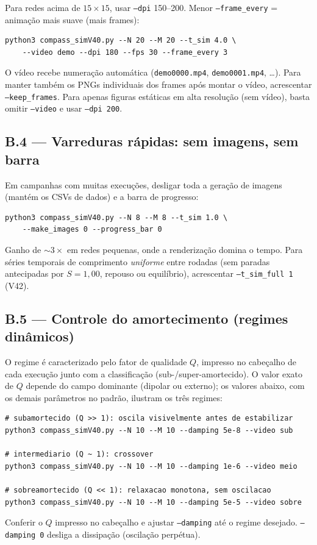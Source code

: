\documentclass[11pt,a4paper]{article}
\newcommand{\code}[1]{\texttt{#1}}
\begin{document}
Para redes acima de $15\times15$, usar \code{--dpi} 150--200. Menor
\code{--frame\_every} = animação mais suave (mais frames):
\begin{verbatim}
python3 compass_simV40.py --N 20 --M 20 --t_sim 4.0 \
    --video demo --dpi 180 --fps 30 --frame_every 3
\end{verbatim}
O vídeo recebe numeração automática (\code{demo0000.mp4},
\code{demo0001.mp4}, \dots). Para manter também os PNGs individuais dos
frames após montar o vídeo, acrescentar \code{--keep\_frames}. Para
apenas figuras estáticas em alta resolução (sem vídeo), basta omitir
\code{--video} e usar \code{--dpi 200}.

\subsection*{B.4 --- Varreduras rápidas: sem imagens, sem barra}

Em campanhas com muitas execuções, desligar toda a geração de imagens
(mantém os CSVs de dados) e a barra de progresso:
\begin{verbatim}
python3 compass_simV40.py --N 8 --M 8 --t_sim 1.0 \
    --make_images 0 --progress_bar 0
\end{verbatim}
Ganho de $\sim 3\times$ em redes pequenas, onde a renderização domina o
tempo. Para séries temporais de comprimento \emph{uniforme} entre
rodadas (sem paradas antecipadas por $S{=}1{,}00$, repouso ou
equilíbrio), acrescentar \code{--t\_sim\_full 1} (V42).

\subsection*{B.5 --- Controle do amortecimento (regimes dinâmicos)}

O regime é caracterizado pelo fator de qualidade $Q$, impresso no
cabeçalho de cada execução junto com a classificação
(sub-/super-amortecido). O valor exato de $Q$ depende do campo
dominante (dipolar ou externo); os valores abaixo, com os demais
parâmetros no padrão, ilustram os três regimes:
\begin{verbatim}
# subamortecido (Q >> 1): oscila visivelmente antes de estabilizar
python3 compass_simV40.py --N 10 --M 10 --damping 5e-8 --video sub

# intermediario (Q ~ 1): crossover
python3 compass_simV40.py --N 10 --M 10 --damping 1e-6 --video meio

# sobreamortecido (Q << 1): relaxacao monotona, sem oscilacao
python3 compass_simV40.py --N 10 --M 10 --damping 5e-5 --video sobre
\end{verbatim}
Conferir o $Q$ impresso no cabeçalho e ajustar \code{--damping} até o
regime desejado. \code{--damping 0} desliga a dissipação (oscilação
perpétua).
\end{document}
